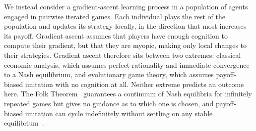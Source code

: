 \documentclass[10pt]{article}
\begin{document}
We instead consider a gradient-ascent learning process in a population of agents engaged in pairwise iterated games. Each individual plays the rest of the population and updates its strategy locally, in the direction that most increases its payoff. Gradient ascent assumes that players have enough cognition to compute their gradient, but that they are myopic, making only local changes to their strategies. Gradient ascent therefore sits between two extremes: classical economic analysis, which assumes perfect rationality and immediate convergence to a Nash equilibrium, and evolutionary game theory, which assumes payoff-biased imitation with no cognition at all. Neither extreme predicts an outcome here. The Folk Theorem~\cite{fudenberg1986-FolkTheoremRepeated} guarantees a continuum of Nash equilibria for infinitely repeated games but gives no guidance as to which one is chosen, and payoff-biased imitation can cycle indefinitely without settling on any stable equilibrium~\cite{imhof2010-StochasticEvolutionaryDynamics,nowak2006-EvolutionaryDynamicsExploring,imhof2005-EvolutionaryCyclesCooperation}.
\end{document}
